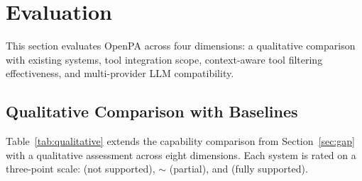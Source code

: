 \section{Evaluation}
\label{sec:evaluation}

This section evaluates OpenPA across four dimensions: a qualitative comparison with existing systems, tool integration scope, context-aware tool filtering effectiveness, and multi-provider LLM compatibility.

\subsection{Qualitative Comparison with Baselines}

Table~\ref{tab:qualitative} extends the capability comparison from Section~\ref{sec:gap} with a qualitative assessment across eight dimensions. Each system is rated on a three-point scale:  (not supported), $\sim$ (partial), and \checkmark (fully supported).

